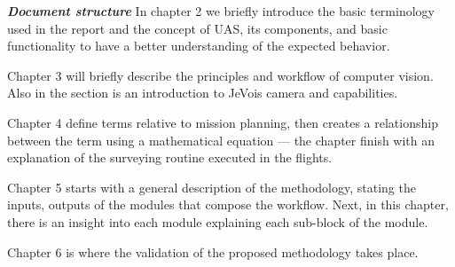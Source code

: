  \textit{\textbf{Document structure}}
In chapter 2 we briefly introduce the basic terminology used in the report and the concept of UAS, its components, and basic functionality to have a better understanding of the expected behavior.

Chapter 3 will briefly describe the principles and workflow of computer vision. Also in the section is an introduction to JeVois camera and capabilities.

Chapter 4 define terms relative to mission planning, then creates a relationship between the term using a mathematical equation — the chapter finish with an explanation of the surveying routine executed in the flights.

Chapter 5 starts with a general description of the methodology, stating the inputs, outputs of the modules that compose the workflow. Next, in this chapter, there is an insight into each module explaining each sub-block of the module.

Chapter 6 is where the validation of the proposed methodology takes place. 


